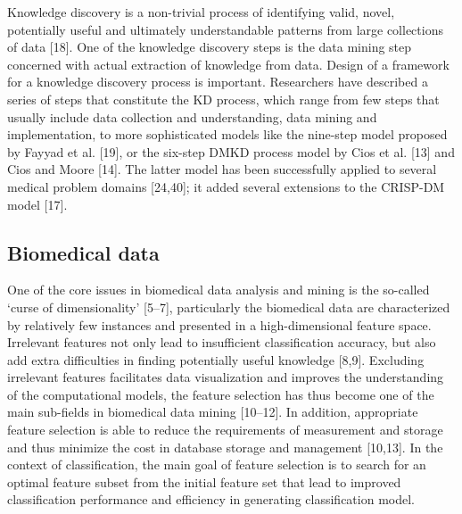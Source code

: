\documentclass[10pt,a4paper]{article}
\begin{document}
	Knowledge discovery is a non-trivial process of identifying valid, novel, potentially useful and ultimately understandable patterns from large collections of data [18]. One of the knowledge discovery steps is the data mining step concerned with actual extraction of knowledge from data. Design of a framework for a knowledge discovery process is important. Researchers have described a series of steps that constitute the KD process, which range from few steps that usually include data collection and understanding, data mining and implementation, to more sophisticated models like the nine-step model proposed by Fayyad et al. [19], or the six-step DMKD process model by Cios et al. [13] and Cios and Moore [14]. The latter model has been successfully applied to several medical problem domains [24,40]; it added several extensions to the CRISP-DM model [17]. \cite{CIOS20021}
	
	\subsection{Biomedical data}
	
	One of the core issues in biomedical data analysis and mining is the so-called ‘curse of dimensionality’ [5–7], particularly the biomedical data are characterized by relatively few instances and presented in a high-dimensional feature space. Irrelevant features not only lead to insufficient classification accuracy, but also add extra difficulties in finding potentially useful knowledge [8,9]. Excluding irrelevant features facilitates data visualization and improves the understanding of the computational models, the feature selection has thus become one of the main sub-fields in biomedical data mining [10–12]. In addition, appropriate feature selection is able to reduce the requirements of measurement and storage and thus minimize the cost in database storage and management [10,13]. In the context of classification, the main goal of feature selection is to search for an optimal feature subset from the initial feature set that lead to improved classification performance and efficiency in generating classification model. \cite{PENG201015}
	
\end{document}
